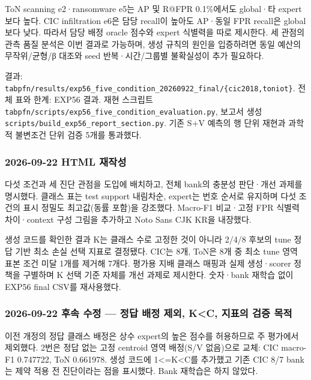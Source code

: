 ToN scanning e2·ransomware e5는 AP 및 R@FPR 0.1\%에서도 global·타 expert보다 높다. CIC infiltration e6은 담당 recall이 높아도 AP·동일 FPR recall은 global보다 낮다. 따라서 담당 배정 oracle 점수와 expert 식별력을 따로 제시한다. 세 관점의 관측 품질 분석은 이번 결과로 가능하며, 생성 규칙의 원인을 입증하려면 동일 예산의 무작위/\allowbreak{}균형/\allowbreak{}β 대조와 seed 반복·시간/\allowbreak{}그룹별 불확실성이 추가 필요하다.

결과: \texttt{tabpfn/\allowbreak{}\allowbreak{}r\allowbreak{}esults/\allowbreak{}\allowbreak{}e\allowbreak{}xp56\_\allowbreak{}\allowbreak{}fiv\allowbreak{}e\_\allowbreak{}\allowbreak{}condit\allowbreak{}ion\_\allowbreak{}\allowbreak{}2026\allowbreak{}0922\_\allowbreak{}\allowbreak{}fin\allowbreak{}al/\allowbreak{}\allowbreak{}\{\allowbreak{}cic2\allowbreak{}018,\allowbreak{}toni\allowbreak{}ot\}\allowbreak{}}. 전체 표와 한계: EXP56 결과. 재현 스크립트 \texttt{tabpfn/\allowbreak{}\allowbreak{}s\allowbreak{}cripts/\allowbreak{}\allowbreak{}e\allowbreak{}xp56\_\allowbreak{}\allowbreak{}fiv\allowbreak{}e\_\allowbreak{}\allowbreak{}condit\allowbreak{}ion\_\allowbreak{}\allowbreak{}eval\allowbreak{}uation.\allowbreak{}p\allowbreak{}y}, 보고서 생성 \texttt{scripts/\allowbreak{}\allowbreak{}build\_\allowbreak{}\allowbreak{}ex\allowbreak{}p56\_\allowbreak{}\allowbreak{}repo\allowbreak{}rt\_\allowbreak{}\allowbreak{}secti\allowbreak{}on.\allowbreak{}py}. 기존 S+\allowbreak{}V 예측의 행 단위 재현과 과학적 불변조건 단위 검증 5개를 통과했다.

\subsubsection{2026-09-22 HTML 재작성}
다섯 조건과 세 진단 관점을 도입에 배치하고, 전체 bank의 충분성 판단·개선 과제를 명시했다. 클래스 표는 test support 내림차순, expert는 번호 순서로 유지하며 다섯 조건의 표시 정밀도 최고값(동률 포함)을 강조했다. Macro-F1 비교·고정 FPR 식별력 차이·context 구성 그림을 추가하고 Noto Sans CJK KR을 내장했다.

생성 코드를 확인한 결과 K는 클래스 수로 고정한 것이 아니라 2/\allowbreak{}4/\allowbreak{}8 후보의 tune 정답 기반 최소 손실 선택 지표로 결정됐다. CIC는 8개, ToN은 8개 중 최소 tune 영역 표본 조건 미달 1개를 제거해 7개다. 평가용 지배 클래스 매핑과 실제 생성·scorer 정책을 구별하며 K 선택 기준 자체를 개선 과제로 제시한다. 숫자·bank 재학습 없이 EXP56 final CSV를 재사용했다.

\subsubsection{2026-09-22 후속 수정 — 정답 배정 제외, K<C, 지표의 검증 목적}
이전 개정의 정답 클래스 배정은 상수 expert의 높은 점수를 허용하므로 주 평가에서 제외했다. 2번은 정답 없는 고정 centroid 영역 배정(S/\allowbreak{}V 없음)으로 교체: CIC macro-F1 0.747722, ToN 0.661978. 생성 코드에 1<=\allowbreak{}K<C를 추가했고 기존 CIC 8/\allowbreak{}7 bank는 제약 적용 전 진단이라는 점을 표시했다. Bank 재학습은 하지 않았다.

